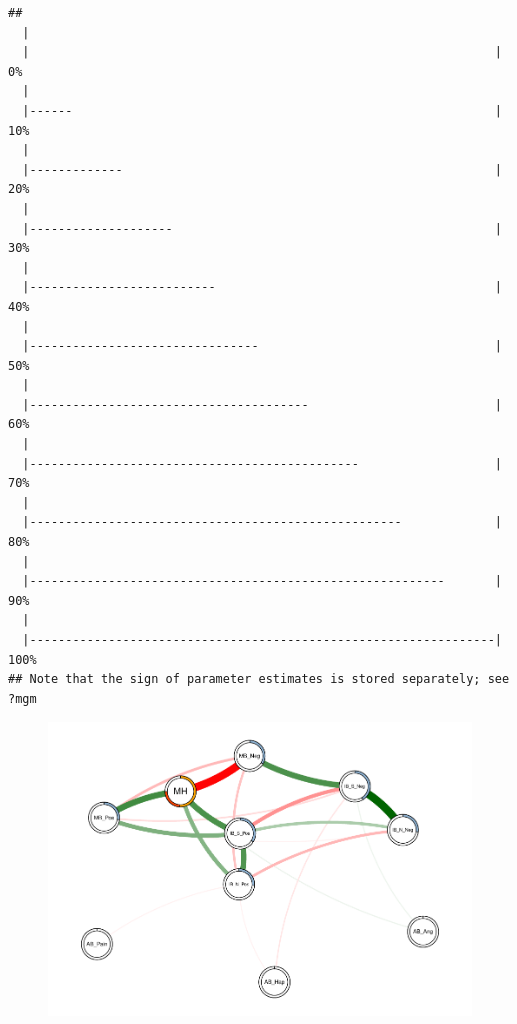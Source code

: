 \documentclass[man,floatsintext]{apa6}
\begin{document}
\begin{verbatim}
## 
  |                                                                       
  |                                                                 |   0%
  |                                                                       
  |------                                                           |  10%
  |                                                                       
  |-------------                                                    |  20%
  |                                                                       
  |--------------------                                             |  30%
  |                                                                       
  |--------------------------                                       |  40%
  |                                                                       
  |--------------------------------                                 |  50%
  |                                                                       
  |---------------------------------------                          |  60%
  |                                                                       
  |----------------------------------------------                   |  70%
  |                                                                       
  |----------------------------------------------------             |  80%
  |                                                                       
  |----------------------------------------------------------       |  90%
  |                                                                       
  |-----------------------------------------------------------------| 100%
## Note that the sign of parameter estimates is stored separately; see ?mgm
\end{verbatim}

\begin{figure}
\centering
\includegraphics{script_files/figure-latex/mgm-1.pdf}
\caption{}
\end{figure}
\end{document}

